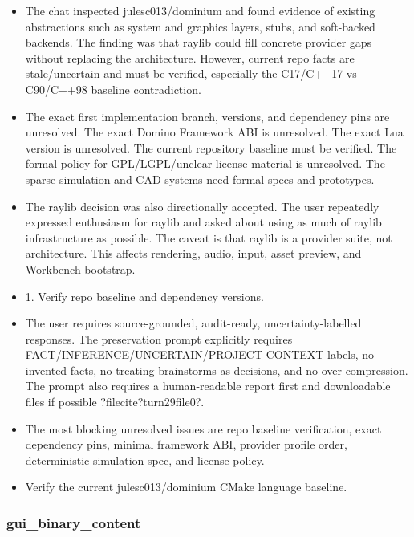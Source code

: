\documentclass[11pt,a4paper]{report}
\begin{document}
\begin{itemize}
\item The chat inspected julesc013/dominium and found evidence of existing abstractions such as system and graphics layers, stubs, and soft-backed backends. The finding was that raylib could fill concrete provider gaps without replacing the architecture. However, current repo facts are stale/uncertain and must be verified, especially the C17/C++17 vs C90/C++98 baseline contradiction.
\item The exact first implementation branch, versions, and dependency pins are unresolved. The exact Domino Framework ABI is unresolved. The exact Lua version is unresolved. The current repository baseline must be verified. The formal policy for GPL/LGPL/unclear license material is unresolved. The sparse simulation and CAD systems need formal specs and prototypes.
\item The raylib decision was also directionally accepted. The user repeatedly expressed enthusiasm for raylib and asked about using as much of raylib infrastructure as possible. The caveat is that raylib is a provider suite, not architecture. This affects rendering, audio, input, asset preview, and Workbench bootstrap.
\item 1. Verify repo baseline and dependency versions.
\item The user requires source-grounded, audit-ready, uncertainty-labelled responses. The preservation prompt explicitly requires FACT/INFERENCE/UNCERTAIN/PROJECT-CONTEXT labels, no invented facts, no treating brainstorms as decisions, and no over-compression. The prompt also requires a human-readable report first and downloadable files if possible ?filecite?turn29file0?.
\item The most blocking unresolved issues are repo baseline verification, exact dependency pins, minimal framework ABI, provider profile order, deterministic simulation spec, and license policy.
\item Verify the current julesc013/dominium CMake language baseline.
\end{itemize}

\subsubsection{gui\_binary\_content}
\end{document}
